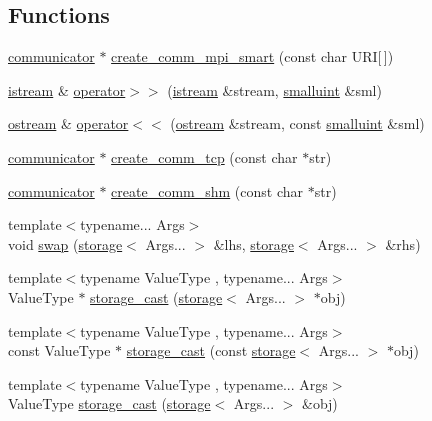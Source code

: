 \subsection*{Functions}
\begin{DoxyCompactItemize}
\item 
\hyperlink{classmui_1_1communicator}{communicator} $\ast$ \hyperlink{namespacemui_a534f89c7f4a430bc9172a2f1fcb520ec}{create\+\_\+comm\+\_\+mpi\+\_\+smart} (const char U\+RI\mbox{[}$\,$\mbox{]})
\item 
\hyperlink{classmui_1_1istream}{istream} \& \hyperlink{namespacemui_a53fe89815786e8278b7b5507651cade9}{operator$>$$>$} (\hyperlink{classmui_1_1istream}{istream} \&stream, \hyperlink{structmui_1_1smalluint}{smalluint} \&sml)
\item 
\hyperlink{classmui_1_1ostream}{ostream} \& \hyperlink{namespacemui_a595e36ff46eee96b5d0b950cfe7075dd}{operator$<$$<$} (\hyperlink{classmui_1_1ostream}{ostream} \&stream, const \hyperlink{structmui_1_1smalluint}{smalluint} \&sml)
\item 
\hyperlink{classmui_1_1communicator}{communicator} $\ast$ \hyperlink{namespacemui_a09c34bd34d9ffe80b43b9a2d58c44834}{create\+\_\+comm\+\_\+tcp} (const char $\ast$str)
\item 
\hyperlink{classmui_1_1communicator}{communicator} $\ast$ \hyperlink{namespacemui_aaa023087095503bcc805eda93a955a89}{create\+\_\+comm\+\_\+shm} (const char $\ast$str)
\item 
{\footnotesize template$<$typename... Args$>$ }\\void \hyperlink{namespacemui_ae23cd838b4bd06ca2e4ca713e2b49507}{swap} (\hyperlink{structmui_1_1storage}{storage}$<$ Args... $>$ \&lhs, \hyperlink{structmui_1_1storage}{storage}$<$ Args... $>$ \&rhs)
\item 
{\footnotesize template$<$typename Value\+Type , typename... Args$>$ }\\Value\+Type $\ast$ \hyperlink{namespacemui_a974c76ff15a66ba1d7dc371904cfd9c1}{storage\+\_\+cast} (\hyperlink{structmui_1_1storage}{storage}$<$ Args... $>$ $\ast$obj)
\item 
{\footnotesize template$<$typename Value\+Type , typename... Args$>$ }\\const Value\+Type $\ast$ \hyperlink{namespacemui_afe85913fc503e4aa1b084631ec523248}{storage\+\_\+cast} (const \hyperlink{structmui_1_1storage}{storage}$<$ Args... $>$ $\ast$obj)
\item 
{\footnotesize template$<$typename Value\+Type , typename... Args$>$ }\\Value\+Type \hyperlink{namespacemui_af0748816507e7dce73b3ffca9f5e2dc0}{storage\+\_\+cast} (\hyperlink{structmui_1_1storage}{storage}$<$ Args... $>$ \&obj)

\end{DoxyCompactItemize}
